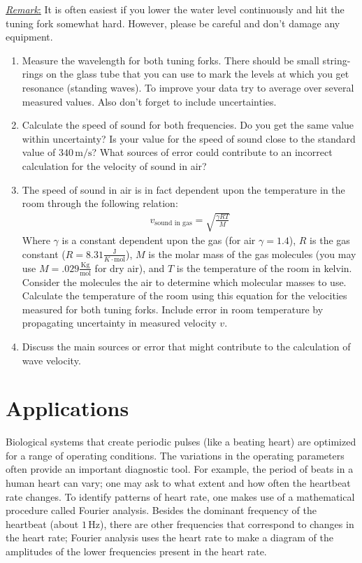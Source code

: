 \underline{\emph{Remark}:} It is often easiest if you lower the water level continuously and hit the tuning fork somewhat hard. However, please be careful and don't damage any equipment.
\begin{enumerate}
\item Measure the wavelength for both tuning forks. There should be small string-rings on the glass tube that you can use to mark the levels at which you get resonance (standing waves). To improve your data try to average over several measured values. Also don't forget to include uncertainties.
\item Calculate the speed of sound for both frequencies. Do you get the same value within uncertainty? Is your value for the speed of sound close to the standard value of $340\,\textrm{m/s}$? What sources of error could contribute to an incorrect calculation for the velocity of sound in air?
\item The speed of sound in air is in fact dependent upon the temperature in the room through the following relation:
\begin{gather}
v_\text{sound in gas} = \sqrt{\frac{\gamma R T}{M}}
\end{gather}
Where $\gamma$ is a constant dependent upon the gas (for air $\gamma=1.4$), $R$ is the gas constant ($R=8.31 \frac{\text{J}}{{K} \cdot \text{mol}}$), $M$ is the molar mass of the gas molecules (you may use $M = .029 \frac{\text{Kg}}{\text{mol}}$ for dry air), and $T$ is the temperature of the room in kelvin. Consider the molecules the air to determine which molecular masses to use. Calculate the temperature of the room using this equation for the velocities measured for both  tuning forks. Include error in room temperature by propagating uncertainty in measured velocity $v$.
\item Discuss the main sources or error that might contribute to the calculation of wave velocity.
\end{enumerate}

\section{Applications}
Biological systems that create periodic pulses (like a beating heart) are optimized for a range of operating conditions. The variations in the operating parameters often provide an important diagnostic tool. For example, the period of beats in a human heart can vary; one may ask to what extent and how often the heartbeat rate changes. To identify patterns of heart rate, one makes use of a mathematical procedure called Fourier analysis. Besides the dominant frequency of the heartbeat (about $1\, \textrm{Hz}$), there are other frequencies that correspond to changes in the heart rate; Fourier analysis uses the heart rate to make a diagram of the amplitudes of the lower frequencies present in the heart rate. \myskip

